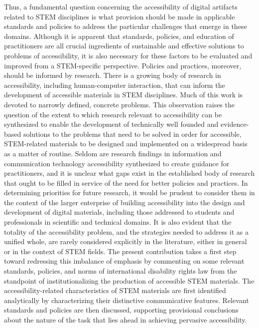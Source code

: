 \documentclass{sig-alternate} %
\begin{document}
\begin{large}
Thus, a fundamental question concerning the accessibility of digital artifacts related to STEM disciplines is what provision should be made in applicable standards and policies to address the particular challenges that emerge in these domains. Although it is apparent that standards, policies, and education of practitioners are all crucial ingredients of sustainable and effective solutions to problems of accessibility, it is also necessary for these factors to be evaluated and improved from a STEM-specific perspective. Policies and practices, moreover, should be informed by research. There is a growing body of research in accessibility, including human-computer interaction, that can inform the development of accessible materials in STEM disciplines. Much of this work is devoted to narrowly defined, concrete problems. This observation raises the question of the extent to which research relevant to accessibility can be synthesized to enable the development of technically well founded and evidence-based solutions to the problems that need to be solved in order for accessible, STEM-related materials to be designed and implemented on a widespread basis as a matter of routine. Seldom are research findings in information and communication technology accessibility synthesized to create guidance for practitioners, and it is unclear what gaps exist in the established body of research that ought to be filled in service of the need for better policies and practices. In determining priorities for future research, it would be prudent to consider them in the context of the larger enterprise of building accessibility into the design and development of digital materials, including those addressed to students and professionals in scientific and technical domains. It is also evident that the totality of the accessibility problem, and the strategies needed to address it as a unified whole, are rarely considered explicitly in the literature, either in general or in the context of STEM fields. The present contribution takes a first step toward redressing this imbalance of emphasis by commenting on some relevant standards, policies, and norms of international disability rights law from the standpoint of institutionalizing the production of accessible STEM materials. The accessibility-related characteristics of STEM materials are first identified analytically by characterizing their distinctive communicative features. Relevant standards and policies are then discussed, supporting provisional conclusions about the nature of the task that lies ahead in achieving pervasive accessibility.


\end{large}
\end{document}
